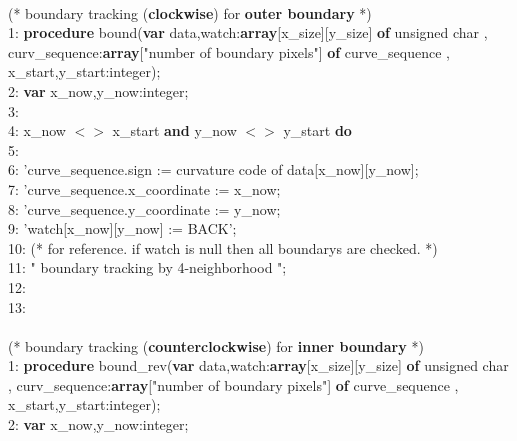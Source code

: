 \documentclass[a4paper,10pt]{jarticle}
\begin{document}
{\\
(* boundary tracking ({\bfseries clockwise}) for {\bfseries outer boundary} *)\\
1: {\bfseries procedure} bound({{\bfseries var} data,watch:{\bfseries array}[x\_size][y\_size] {\bfseries of} unsigned char , curv\_sequence:{\bfseries array}["number of boundary pixels"] {\bfseries of} curve\_sequence , x\_start,y\_start:integer);\\
2: {\bfseries var} x\_now,y\_now:integer;\\
3: \hspace{0cm}{\bfseries begin}\\
4: \hspace{0.5cm}{\bfseries while} x\_now $<>$ x\_start {\bfseries and} y\_now $<>$ y\_start {\bfseries do}\\
5: \hspace{1cm}{\bfseries begin}\\
6: \hspace{1.5cm}'curve\_sequence.sign := curvature code of data[x\_now][y\_now];\\
7: \hspace{1.5cm}'curve\_sequence.x\_coordinate := x\_now;\\
8: \hspace{1.5cm}'curve\_sequence.y\_coordinate := y\_now;\\
9: \hspace{1.5cm}'watch[x\_now][y\_now] := BACK';\\
10: \hspace{1.5cm}(* for reference. if watch is null then all boundarys are checked. *)\\
11: \hspace{1.5cm}" boundary tracking by 4-neighborhood ";\\
12: \hspace{1cm}{\bfseries end}\\
13: \hspace{0cm}{\bfseries end;}\\
\\
(* boundary tracking ({\bfseries counterclockwise}) for {\bfseries inner boundary} *)\\
1: {\bfseries procedure} bound\_rev({{\bfseries var} data,watch:{\bfseries array}[x\_size][y\_size] {\bfseries of} unsigned char , curv\_sequence:{\bfseries array}["number of boundary pixels"] {\bfseries of} curve\_sequence  , x\_start,y\_start:integer);\\
2: {\bfseries var} x\_now,y\_now:integer;\\
}}}
\end{document}
